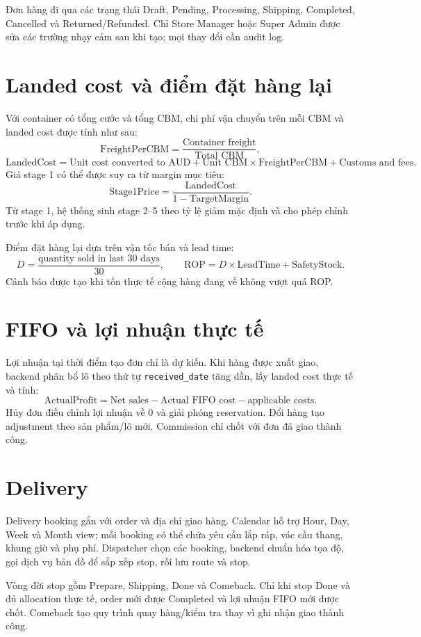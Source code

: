 \documentclass[12pt,a4paper]{report}
\begin{document}
Đơn hàng đi qua các trạng thái Draft, Pending, Processing, Shipping, Completed, Cancelled và Returned/Refunded. Chỉ Store Manager hoặc Super Admin được sửa các trường nhạy cảm sau khi tạo; mọi thay đổi cần audit log.

\section{Landed cost và điểm đặt hàng lại}
Với container có tổng cước và tổng CBM, chi phí vận chuyển trên mỗi CBM và landed cost được tính như sau:
\[
  \text{FreightPerCBM} =
  \frac{\text{Container freight}}{\text{Total CBM}},
\]
\[
  \text{LandedCost} =
  \text{Unit cost converted to AUD}
  + \text{Unit CBM}\times\text{FreightPerCBM}
  + \text{Customs and fees}.
\]
Giá stage 1 có thể được suy ra từ margin mục tiêu:
\[
  \text{Stage1Price} =
  \frac{\text{LandedCost}}{1-\text{TargetMargin}}.
\]
Từ stage 1, hệ thống sinh stage 2--5 theo tỷ lệ giảm mặc định và cho phép chỉnh trước khi áp dụng.

Điểm đặt hàng lại dựa trên vận tốc bán và lead time:
\[
  D = \frac{\text{quantity sold in last 30 days}}{30},
  \qquad
  \text{ROP}=D\times\text{LeadTime}+\text{SafetyStock}.
\]
Cảnh báo được tạo khi tồn thực tế cộng hàng đang về không vượt quá ROP.

\section{FIFO và lợi nhuận thực tế}
Lợi nhuận tại thời điểm tạo đơn chỉ là dự kiến. Khi hàng được xuất giao, backend phân bổ lô theo thứ tự \texttt{received\_date} tăng dần, lấy landed cost thực tế và tính:
\[
  \text{ActualProfit} =
  \text{Net sales} - \text{Actual FIFO cost} - \text{applicable costs}.
\]
Hủy đơn điều chỉnh lợi nhuận về 0 và giải phóng reservation. Đổi hàng tạo adjustment theo sản phẩm/lô mới. Commission chỉ chốt với đơn đã giao thành công.

\section{Delivery}
Delivery booking gắn với order và địa chỉ giao hàng. Calendar hỗ trợ Hour, Day, Week và Month view; mỗi booking có thể chứa yêu cầu lắp ráp, vác cầu thang, khung giờ và phụ phí. Dispatcher chọn các booking, backend chuẩn hóa tọa độ, gọi dịch vụ bản đồ để sắp xếp stop, rồi lưu route và stop.

Vòng đời stop gồm Prepare, Shipping, Done và Comeback. Chỉ khi stop Done và đủ allocation thực tế, order mới được Completed và lợi nhuận FIFO mới được chốt. Comeback tạo quy trình quay hàng/kiểm tra thay vì ghi nhận giao thành công.
\end{document}
